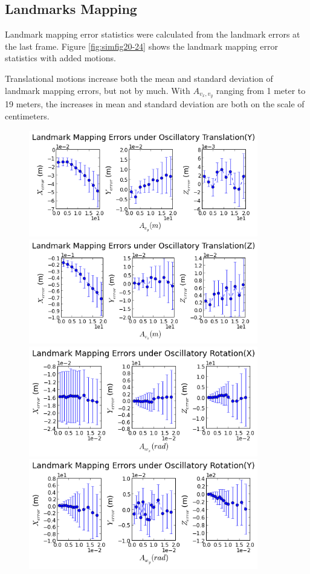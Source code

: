 \subsection{Landmarks Mapping}\label{sec:landmarkMotion}
Landmark mapping error statistics were calculated from the landmark
errors at the last frame. Figure \ref{fig:simfig20-24} shows the
landmark mapping error statistics with added motions. 

Translational motions increase both the mean and standard deviation
of landmark mapping errors, but not by much. With $A_{v_x, v_y}$
ranging from 1 meter to 19 meters, the increases in mean and standard
deviation are both on the scale of centimeters.

\begin{figure}[h]
  \centering
  \includegraphics[width=10cm, keepaspectratio=true]{./Figures/SimulationFigures/Figure20.png}
  \includegraphics[width=10cm, keepaspectratio=true]{./Figures/SimulationFigures/Figure21.png}
  \includegraphics[width=10cm, keepaspectratio=true]{./Figures/SimulationFigures/Figure22.png}
  \includegraphics[width=10cm, keepaspectratio=true]{./Figures/SimulationFigures/Figure23.png}

\end{figure}
